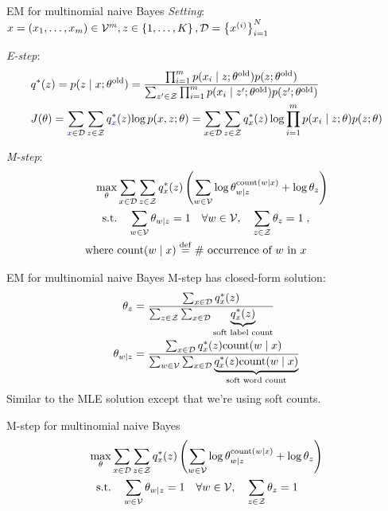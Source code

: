 \documentclass[usenames,dvipsnames,notes]{beamer}
\begin{document}
\begin{frame}
    {EM for multinomial naive Bayes}
    \emph{Setting}: $x = (x_1,\ldots,x_m) \in \mathcal{V}^m, z\in\left\{ 1,\ldots,K \right\}, \mathcal{D}=\left\{ x^{(i)} \right\}_{i=1}^N$

    \emph{E-step}:
    \vspace{-1em}
    \begin{align*}
        &q^*(z) = p(z\mid x; \theta^{\text{old}}) = 
        \frac{\prod_{i=1}^m p(x_i\mid z; \theta^{\text{old}})p(z;\theta^{\text{old}})}
        {\sum_{z'\in\mathcal{Z}} \prod_{i=1}^m p(x_i\mid z'; \theta^{\text{old}})p(z';\theta^{\text{old}})}\\
        &J(\theta) = \sum_{{\color{blue}x}\in\mathcal{D}} \sum_{z\in\mathcal{Z}} q^*_{\color{blue}x}(z) {\log p(x,z;\theta)} 
        = \sum_{x\in\mathcal{D}} \sum_{z\in\mathcal{Z}} q^*_x(z) \log
        {\prod_{i=1}^m p(x_i\mid z;\theta) p(z;\theta)} 
    \end{align*}

    \emph{M-step}:
    \vspace{-1em}
    \begin{align*}
        \max_\theta& \sum_{x\in\mathcal{D}} \sum_{z\in\mathcal{Z}}q^*_x(z)\left(  \sum_{w\in\mathcal{V}}
        \log \theta_{w\mid z}^{\text{count}(w\mid x)} + \log \theta_z  \right)\\
        \text{s.t.} & \quad \sum_{w\in\mathcal{V}} \theta_{w\mid z} = 1 \quad \forall w\in\mathcal{V},
        \quad \sum_{z\in\mathcal{Z}}\theta_z = 1 \;,\\
        \text{where } & \text{count}(w\mid x) \stackrel{\rm def}{=} \text{\# occurrence of $w$ in $x$}
    \end{align*}
\end{frame}

\begin{frame}
    {EM for multinomial naive Bayes}
    M-step has closed-form solution:
    \begin{align*}
        \theta_z &= \frac{\sum_{x\in\mathcal{D}} q^*_x(z)}
        {\sum_{z\in\mathcal{Z}} \sum_{x\in\mathcal{D}}\underbrace{q^*_x(z)}_{\text{soft label count}}}\\
        \theta_{w\mid z} &= \frac{
            \sum_{x\in\mathcal{D}} q^*_x(z)\text{count}(w\mid x)  
        }{
            \sum_{w\in\mathcal{V}}\sum_{x\in\mathcal{D}} \underbrace{q^*_x(z)\text{count}(w\mid x)}_{\text{soft word count}
        }}
    \end{align*}
    Similar to the MLE solution except that we're using soft counts.
\end{frame}

\begin{frame}
    {M-step for multinomial naive Bayes}
    \begin{align*}
        \max_\theta& \sum_{x\in\mathcal{D}} \sum_{z\in\mathcal{Z}}q^*_x(z)\left(  \sum_{w\in\mathcal{V}}
        \log \theta_{w\mid z}^{\text{count}(w\mid x)} + \log \theta_z  \right)\\
        \text{s.t.} & \quad \sum_{w\in\mathcal{V}} \theta_{w\mid z} = 1 \quad \forall w\in\mathcal{V},
        \quad \sum_{z\in\mathcal{Z}}\theta_z = 1
    \end{align*}
    \vspace{14em}
\end{frame}
\end{document}
